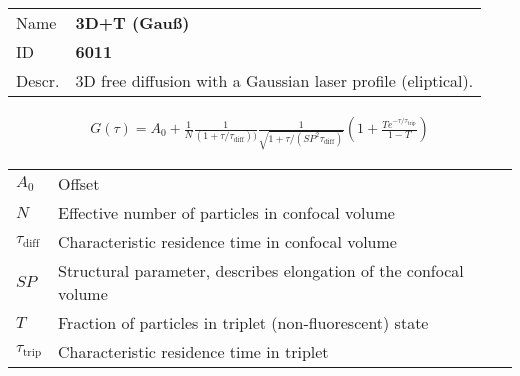 \noindent \begin{tabular}{lp{}}
Name & \textbf{3D+T (Gauß)} \\ 
ID & \textbf{6011} \\ 
Descr. &  3D free diffusion with a Gaussian laser profile (eliptical). \\ 
\end{tabular}
\begin{align}
G(\tau) = A_0 + \frac{1}{N} \frac{1}{(1+\tau/\tau_\mathrm{diff}))} \frac{1}{\sqrt{1+\tau/(\mathit{SP}^2 \tau_\mathrm{diff})}} \left(1 + \frac{T e^{-\tau/\tau_\mathrm{trip}}}{1-T}  \right)
\end{align} 
\begin{center}
\begin{tabular}{ll}
$A_0$ & Offset \\ 
$N$ & Effective number of particles in confocal volume \\ 
$\tau_\mathrm{diff}$ &  Characteristic residence time in confocal volume \\ 
$\mathit{SP}$ & Structural parameter, describes elongation of the confocal volume \\
$T$ &  Fraction of particles in triplet (non-fluorescent) state\\ 
$\tau_\mathrm{trip}$ &  Characteristic residence time in triplet \\
\end{tabular}
\end{center}
\vspace{2em}


